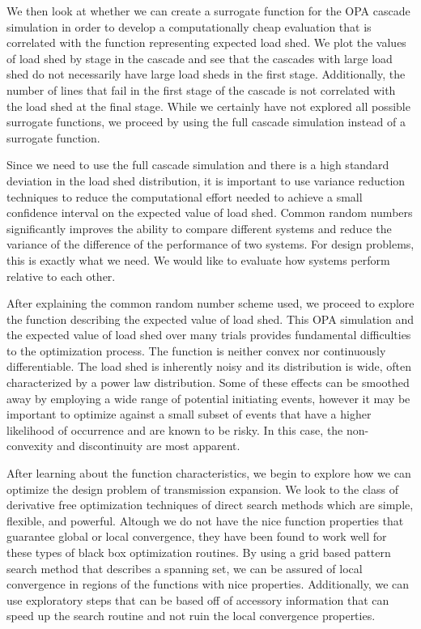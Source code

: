 We then look at whether we can create a surrogate function for the OPA cascade simulation in order to develop a computationally cheap evaluation that is correlated with the function representing expected load shed.  We plot the values of load shed by stage in the cascade and see that the cascades with large load shed do not necessarily have large load sheds in the first stage.  Additionally, the number of lines that fail in the first stage of the cascade is not correlated with the load shed at the final stage.  While we certainly have not explored all possible surrogate functions, we proceed by using the full cascade simulation instead of a surrogate function.

Since we need to use the full cascade simulation and there is a high standard deviation in the load shed distribution, it is important to use variance reduction techniques to reduce the computational effort needed to achieve a small confidence interval on the expected value of load shed.  Common random numbers significantly improves the ability to compare different systems and reduce the variance of the difference of the performance of two systems.  For design problems, this is exactly what we need.  We would like to evaluate how systems perform relative to each other. 

After explaining the common random number scheme used, we proceed to explore the function describing the expected value of load shed.  This OPA simulation and the expected value of load shed over many trials provides fundamental difficulties to the optimization process.  The function is neither convex nor continuously differentiable.  The load shed is inherently noisy and its  distribution is wide, often characterized by a power law distribution.  Some of these effects can be smoothed away by employing a wide range of potential initiating events, however it may be important to optimize against a small subset of events that have a higher likelihood of occurrence and are known to be risky.  In this case, the non-convexity and discontinuity are most apparent. 

After learning about the function characteristics, we begin to explore how we can optimize the design problem of transmission expansion.  We look to the class of derivative free optimization techniques of direct search methods which are simple, flexible, and powerful.  Altough we do not have the nice function properties that guarantee global or local convergence, they have been found to work well for these types of black box optimization routines.  By using a grid based pattern search method that describes a spanning set, we can be assured of local convergence in regions of the functions with nice properties.  Additionally, we can use exploratory steps that can be based off of accessory information that can speed up the search routine and not ruin the local convergence properties.

